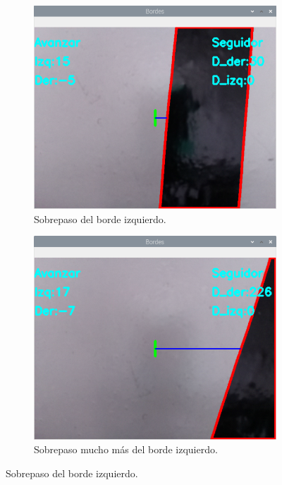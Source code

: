 \documentclass[11pt,a4paper]{article}
\begin{document}
\begin{itemize}
		\begin{figure}[h!]
			\centering
			\begin{subfigure}{0.45\textwidth}
				\includegraphics[width=\textwidth]{imagenes/seguidor_pasado_izq1.png}
				\caption{Sobrepaso del borde izquierdo.}
				\label{subfig:seguidor_pasa_izq}
			\end{subfigure}
			\hfill
			\begin{subfigure}{0.45\textwidth}
				\includegraphics[width=\textwidth]{imagenes/seguidor_pasado_izq2.png}
				\caption{Sobrepaso mucho más del borde izquierdo.}
				\label{subfig:seguidor_pasa_izq2}
			\end{subfigure}
			\caption{Sobrepaso del borde izquierdo.}
			\label{fig:seguidor_pasa_izq}
		\end{figure}
		

\end{itemize}
\end{document}
